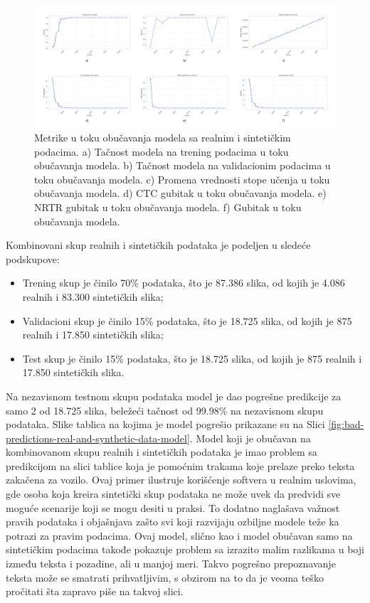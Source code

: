 \documentclass[a4paper,12pt]{article}
\begin{document}
	\begin{figure}[H]
		\centering
		\includegraphics[width=\textwidth]{assets/real-and-synthetic-data-metrics.png}
		\caption{Metrike u toku obučavanja modela sa realnim i sintetičkim podacima. a) Tačnost modela na trening podacima u toku obučavanja modela. b) Tačnost modela na validacionim podacima u toku obučavanja modela. c) Promena vrednosti stope učenja u toku obučavanja modela. d) CTC gubitak u toku obučavanja modela. e) NRTR gubitak u toku obučavanja modela. f) Gubitak u toku obučavanja modela.}
		\label{fig:real-and-synthetic-data-metrics}
	\end{figure}
	
	Kombinovani skup realnih i sintetičkih podataka je podeljen u sledeće podskupove:
	\begin{itemize}
		\item Trening skup je činilo 70\% podataka, što je 87.386 slika, od kojih je 4.086 realnih i 83.300 sintetičkih slika;
		\item Validacioni skup je činilo 15\% podataka, što je 18.725 slika, od kojih je 875 realnih i 17.850 sintetičkih slika;
		\item Test skup je činilo 15\% podataka, što je 18.725 slika, od kojih je 875 realnih i 17.850 sintetičkih slika.
	\end{itemize}
	
	Na nezavisnom testnom skupu podataka model je dao pogrešne predikcije za samo 2 od 18.725 slika, beležeći tačnost od 99.98\% na nezavisnom skupu podataka. Slike tablica na kojima je model pogrešio prikazane su na Slici \ref{fig:bad-predictions-real-and-synthetic-data-model}. Model koji je obučavan na kombinovanom skupu realnih i sintetičkih podataka je imao problem sa predikcijom na slici tablice koja je pomoćnim trakama koje prelaze preko teksta zakačena za vozilo. Ovaj primer ilustruje korišćenje softvera u realnim uslovima, gde osoba koja kreira sintetički skup podataka ne može uvek da predvidi sve moguće scenarije koji se mogu desiti u praksi. To dodatno naglašava važnost pravih podataka i objašnjava zašto svi koji razvijaju ozbiljne modele teže ka potrazi za pravim podacima. Ovaj model, slično kao i model obučavan samo na sintetičkim podacima takođe pokazuje problem sa izrazito malim razlikama u boji između teksta i pozadine, ali u manjoj meri. Takvo pogrešno prepoznavanje teksta može se smatrati prihvatljivim, s obzirom na to da je veoma teško pročitati šta zapravo piše na takvoj slici.
	
\end{document}
